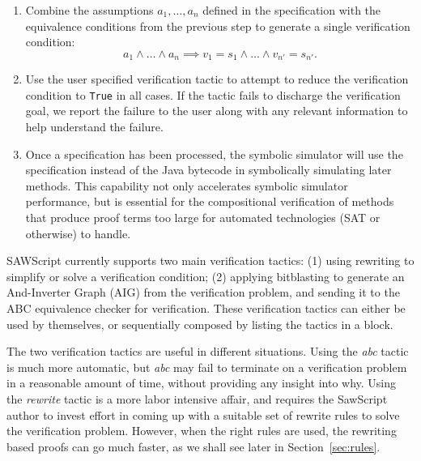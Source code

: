 \documentclass[12pt]{galois-whitepaper}
\newcommand{\sawScript}{{\sc SawScript}\xspace}
\begin{document}
\begin{enumerate}
\begin{itemize}
 \end{itemize}

 \item Combine the assumptions $a_1, \dots, a_n$ defined in the specification
         with the equivalence conditions from the previous step to generate a single
         verification condition:
       \[ a_1 \wedge \dots \wedge a_n \implies
         v_1 = s_1 \wedge \dots \wedge v_{n'} = s_{n'}.\]

 \item Use the user specified verification tactic to attempt to reduce the verification
         condition to {\tt True} in all cases.  If the tactic fails to discharge the
         verification goal, we report the failure to the user along with any
         relevant information to help understand the failure.
         
 \item Once a specification has been processed, the symbolic simulator will
         use the specification instead of the Java bytecode in symbolically
         simulating later methods.  This capability not only accelerates symbolic
         simulator performance, but is essential for the compositional
         verification of methods that produce proof terms too large for automated
         technologies (SAT or otherwise) to handle.
           
\end{enumerate}

SAWScript currently supports two main verification tactics: (1) using rewriting
to simplify or solve a verification condition; (2) applying bitblasting to
generate an And-Inverter Graph (AIG) from the verification problem, and sending
it to the ABC equivalence checker for verification.  These verification
tactics can either be used by themselves, or sequentially composed by listing the
tactics in a block.

The two verification tactics are useful in different situations.  Using the
\emph{abc} tactic is much more automatic, but \emph{abc} may fail to terminate
on a verification problem in a reasonable amount of time, 
without providing any insight into why.  Using the
\emph{rewrite} tactic is a more labor intensive affair, and requires the
\sawScript author to invest effort in coming up with a suitable set of rewrite rules
to solve the verification problem. However, when the right rules are used, the
rewriting based proofs can go much faster, as we shall see later in Section~\ref{sec:rules}.
\end{document}
